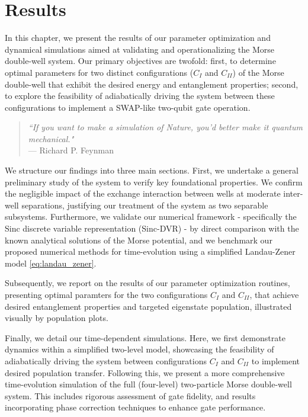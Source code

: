 \documentclass{subfiles}
\begin{document}
\chapter{Results}\label{chap:4}
In this chapter, we present the results of our parameter optimization and dynamical simulations aimed at validating and operationalizing the Morse double-well system. Our primary objectives are twofold: first, to determine optimal parameters for two distinct configurations ($C_I$ and $C_{II}$) of the Morse double-well that exhibit the desired energy and entanglement properties; second, to explore the feasibility of adiabatically driving the system between these configurations to implement a SWAP-like two-qubit gate operation.

\begin{quote}
    \centering
    \textit{“If you want to make a simulation of Nature, you'd better make it quantum mechanical."}\\
    \vspace{0.2cm}
    --- Richard P. Feynman    
\end{quote}



We structure our findings into three main sections. First, we undertake a general preliminary study of the system to verify key foundational properties. We confirm the negligible impact of the exchange interaction between wells at moderate inter-well separations, justifying our treatment of the system as two separable subsystems. Furthermore, we validate our numerical framework - specifically the Sinc discrete variable representation (Sinc-DVR) - by direct comparison with the known analytical solutions of the Morse potential, and we benchmark our proposed numerical methods for time-evolution using a simplified Landau-Zener model \eqref{eq:landau_zener}.

Subsequently, we report on the results of our parameter optimization routines, presenting optimal paramters for the two configurations $C_I$ and $C_{II}$, that achieve desired entanglement properties and targeted eigenstate population, illustrated visually by population plots.

Finally, we detail our time-dependent simulations. Here, we first demonstrate dynamics within a simplified two-level model, showcasing the feasibility of adiabatically driving the system between configurations $C_I$ and $C_{II}$ to implement desired population transfer. Following this, we present a more comprehensive time-evolution simulation of the full (four-level) two-particle Morse double-well system. This includes rigorous assessment of gate fidelity, and results incorporating phase correction techniques to enhance gate performance.

\newpage



\end{document}

